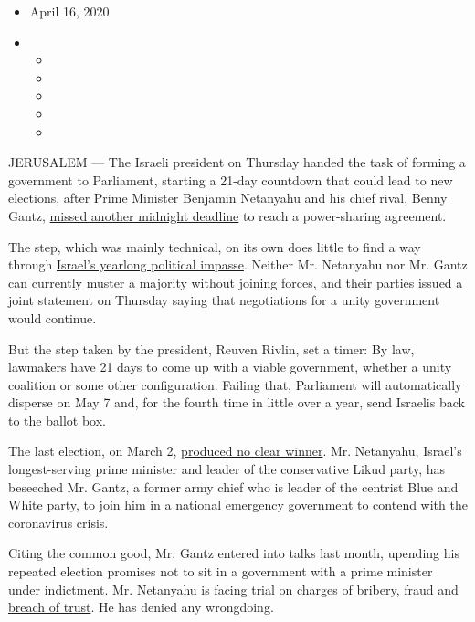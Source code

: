 \begin{itemize}
\item
  April 16, 2020
\item
  \begin{itemize}
  \item
  \item
  \item
  \item
  \item
  \end{itemize}
\end{itemize}

JERUSALEM --- The Israeli president on Thursday handed the task of
forming a government to Parliament, starting a 21-day countdown that
could lead to new elections, after Prime Minister Benjamin Netanyahu and
his chief rival, Benny Gantz,
\href{https://www.nytimes.com/2020/04/14/world/middleeast/israel-coronavirus-netanyahu-gantz.html}{missed
another midnight deadline} to reach a power-sharing agreement.

The step, which was mainly technical, on its own does little to find a
way through
\href{https://www.nytimes.com/2019/09/23/world/middleeast/israel-election-rivlin-netanyahu-gantz.html}{Israel's
yearlong political impasse}. Neither Mr. Netanyahu nor Mr. Gantz can
currently muster a majority without joining forces, and their parties
issued a joint statement on Thursday saying that negotiations for a
unity government would continue.

But the step taken by the president, Reuven Rivlin, set a timer: By law,
lawmakers have 21 days to come up with a viable government, whether a
unity coalition or some other configuration. Failing that, Parliament
will automatically disperse on May 7 and, for the fourth time in little
over a year, send Israelis back to the ballot box.

The last election, on March 2,
\href{https://www.nytimes.com/2020/03/03/world/middleeast/israel-election-takeaways.html}{produced
no clear winner}. Mr. Netanyahu, Israel's longest-serving prime minister
and leader of the conservative Likud party, has beseeched Mr. Gantz, a
former army chief who is leader of the centrist Blue and White party, to
join him in a national emergency government to contend with the
coronavirus crisis.

Citing the common good, Mr. Gantz entered into talks last month,
upending his repeated election promises not to sit in a government with
a prime minister under indictment. Mr. Netanyahu is facing trial on
\href{https://www.nytimes.com/2019/11/21/world/middleeast/netanyahu-corruption-indicted.html}{charges
of bribery, fraud and breach of trust}. He has denied any wrongdoing.

